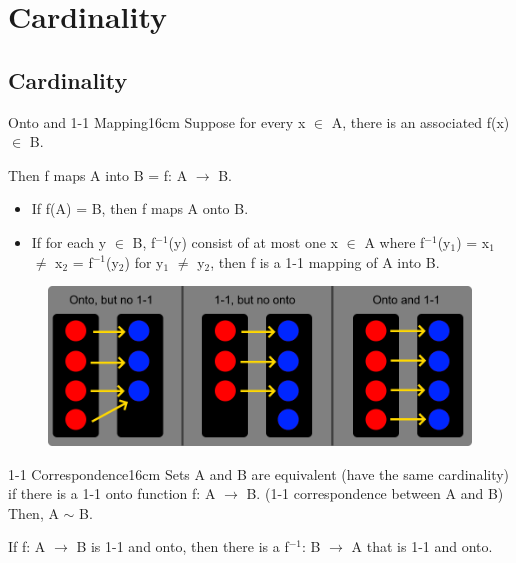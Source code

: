 \newpage

\section[Day 4: Cardinality]{ Cardinality }

\subsection{ Cardinality }

	\begin{definition}{Onto and 1-1 Mapping}{16cm}
		Suppose for every x $\in$ A, there is an associated f(x) $\in$ B.

		Then f maps A into B = f: A $\rightarrow$ B.

		\begin{itemize}[leftmargin=1cm, itemsep=0.1cm]
			\item If f(A) = B, then f maps A onto B.
			
			\item If for each y $\in$ B, f$^{-1}$(y) consist of at most one x $\in$ A
				where f$^{-1}$(y$_1$) = x$_1$ $\neq$ x$_2$ = f$^{-1}$(y$_2$) for
				y$_1$ $\neq$ y$_2$, then f is a 1-1 mapping of A into B.
		\end{itemize}
	\end{definition}



	\begin{figure}[h]
		\centering
		\includegraphics[scale=0.27]{Images/4.1.1.png}
	\end{figure}



	\begin{definition}{1-1 Correspondence}{16cm}
		Sets A and B are equivalent {\color{lblue} (have the same cardinality)}
		if there is a 1-1 onto function f: A $\rightarrow$ B.
		{\color{lblue} (1-1 correspondence between A and B)}
		Then, A $\sim$ B.

		If f: A $\rightarrow$ B is 1-1 and onto, then
		there is a f$^{-1}$: B $\rightarrow$ A that is 1-1 and onto.
	\end{definition}

